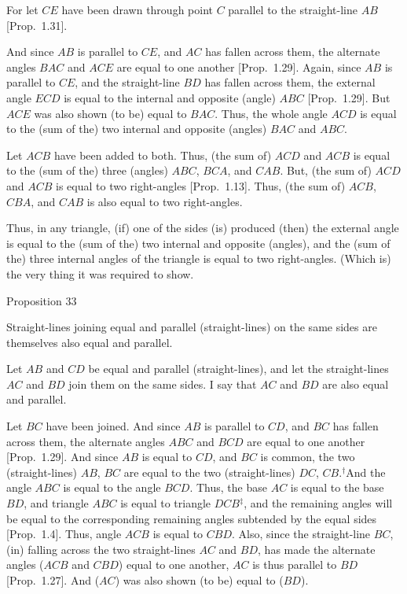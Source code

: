 For let $CE$ have been drawn through point $C$ parallel to the straight-line
$AB$ [Prop.~1.31].

And since $AB$ is parallel to $CE$, and $AC$ has fallen across them, the alternate
angles $BAC$ and $ACE$ are equal to one another [Prop.~1.29]. Again,
since $AB$ is parallel to $CE$, and the straight-line $BD$ has fallen across them, 
the external angle $ECD$ is equal to the internal and opposite (angle)
$ABC$ [Prop.~1.29]. But $ACE$ was also shown (to be) equal to $BAC$. Thus, the whole
angle $ACD$ is equal to the (sum of the) two internal and opposite (angles) $BAC$ and $ABC$.

Let $ACB$ have been added to both. Thus, (the sum of) $ACD$ and $ACB$ is equal to
the (sum of the) three (angles) $ABC$, $BCA$, and $CAB$. But, (the sum of) $ACD$ and $ACB$ is equal
to two right-angles [Prop.~1.13]. Thus, (the sum of) $ACB$, $CBA$, and $CAB$ is also
equal to two right-angles.

Thus, in any triangle,  (if) one of the sides  (is) produced (then) the external
angle is equal to the (sum of the) two internal and opposite (angles), and the (sum of the) three
internal angles of the triangle is equal to two right-angles. (Which is)
the very thing it was required to show.


\begin{center}
{\large Proposition 33}
\end{center}

Straight-lines joining equal and parallel (straight-lines) on the same sides
are  themselves also equal and parallel.

\epsfysize=1.7in
\centerline{}

Let $AB$ and $CD$ be equal and parallel (straight-lines), and let the
straight-lines $AC$ and $BD$ join them on the same sides. I say that $AC$
and $BD$ are also equal and parallel.

Let $BC$ have been joined. And since $AB$ is parallel to $CD$, and $BC$ has
fallen across them, the alternate angles $ABC$ and $BCD$ are equal to one another [Prop.~1.29]. And since $AB$ is equal to $CD$, and $BC$ is common,
the two (straight-lines) $AB$, $BC$ are equal to the two (straight-lines)
$DC$, $CB$.$^\dag$And the angle $ABC$ is equal to the angle $BCD$. Thus, the
base $AC$ is equal to the base $BD$, and triangle $ABC$ is equal to triangle
$DCB$$^\ddag$, and the remaining angles will be equal to the corresponding remaining
angles subtended by the equal sides [Prop.~1.4]. Thus,  angle $ACB$ 
is equal to $CBD$. Also, since the straight-line $BC$, (in) falling across the two
straight-lines $AC$ and $BD$, has made the alternate angles  ($ACB$ and $CBD$) equal to one another,
$AC$ is thus parallel to $BD$ [Prop.~1.27]. And ($AC$) was also shown (to be) equal
to ($BD$).

